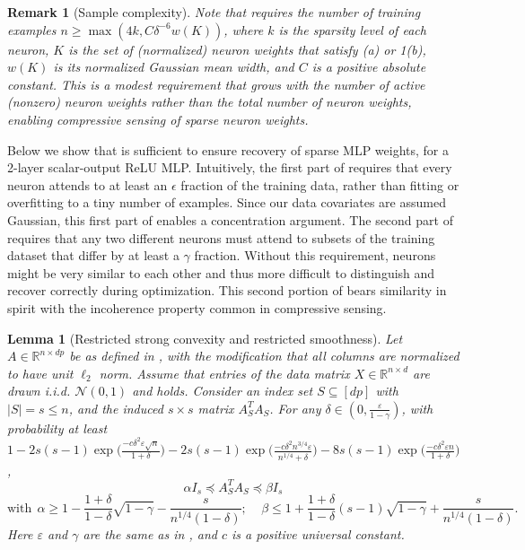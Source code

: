 \documentclass{article} %
\newcommand{\n}{\ensuremath{n}}
\newcommand{\p}{\ensuremath{p}}
\newcommand{\datadim}{\ensuremath{d}}
\newcommand{\X}{\ensuremath{X}}
\newtheorem{lemma}{Lemma}
\newtheorem{remark}{Remark}
\newcommand{\1}{\ensuremath{{\sf (i)}}}
\newcommand{\2}{\ensuremath{{\sf (ii)}}}
\newcommand{\3}{\ensuremath{{\sf (iii)}}}
\newcommand{\4}{\ensuremath{{\sf (iv)}}}
\newcommand{\5}{\ensuremath{{\sf (v)}}}
\newcommand{\6}{\ensuremath{{\sf (vi)}}}
\newcommand{\R}{\mathbb{R}}
\begin{document}
\begin{remark}[Sample complexity]
\label{remark:ndependence}
    Note that  requires the number of training examples $\n \geq \max(4k, C\delta^{-6}w(K))$, where $k$ is the sparsity level of each neuron, $K$ is the set of (normalized) neuron weights that satisfy (a) or 1(b), $w(K)$ is its normalized Gaussian mean width, and $C$ is a positive absolute constant. This is a modest requirement that grows with the number of active (nonzero) neuron weights rather than the total number of neuron weights, enabling compressive sensing of sparse neuron weights.
\end{remark}


    Below we show that  is sufficient to ensure recovery of sparse MLP weights, for a 2-layer scalar-output ReLU MLP. Intuitively, the first part of  requires that every neuron attends to at least an $\epsilon$ fraction of the training data, rather than fitting or overfitting to a tiny number of examples. Since our data covariates are assumed Gaussian, this first part of  enables a concentration argument. The second part of  requires that any two different neurons must attend to subsets of the training dataset that differ by at least a $\gamma$ fraction. Without this requirement, neurons might be very similar to each other and thus more difficult to distinguish and recover correctly during optimization. This second portion of  bears similarity in spirit with the incoherence property common in compressive sensing.


\begin{lemma}[Restricted strong convexity and restricted smoothness]\label{lemma:rsc_rss}
Let $A \in \R^{\n \times \datadim \p}$ be as defined in , with the modification that all columns are normalized to have unit $\ell_2$ norm. Assume that entries of the data matrix $\X \in \R^{\n \times \datadim}$ are drawn i.i.d. $\mathcal{N}(0,1)$ and  holds. 
    Consider an index set $S \subseteq [\datadim\p]$ with $|S| = s \leq \n$, and the induced $s \times s$ matrix $A_S^TA_S$. 
    For any $\delta \in (0, \frac{\varepsilon}{1-\gamma})$, with probability at least $1 - 2s(s-1)\exp{\big(\frac{-c\delta^2\varepsilon\sqrt{\n}}{1+\delta}\big)} - 2s(s-1)\exp{\big(\frac{-c\delta^2 \n^{3/4} \varepsilon}{\n^{1/4} +\delta  }\big)} - 8s(s-1)\exp{\big(\frac{-c\delta^2\varepsilon \n}{1+\delta}\big)}$,
    \begin{equation*}
        \alpha I_s \preceq A_S^TA_S \preceq \beta I_s
    \end{equation*}
     \begin{equation*}
        \mbox{with}~~ \alpha \geq 1 - \frac{1+\delta}{1-\delta}\sqrt{1 - \gamma} - \frac{s}{\n^{1/4}(1-\delta)}; ~~~~~\beta \leq 1 + \frac{1+\delta}{1-\delta}(s-1)\sqrt{1-\gamma} + \frac{s}{\n^{1/4}(1-\delta)} .
    \end{equation*}
    Here $\varepsilon$ and $\gamma$ are the same as in , and $c$ is a positive universal constant.
\end{lemma}
\end{document}
